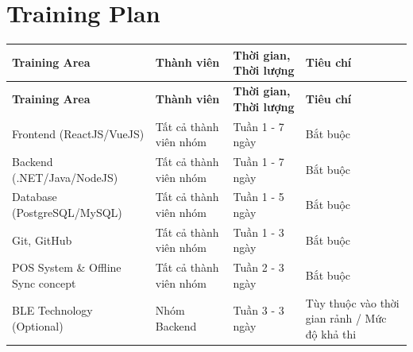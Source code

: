 \documentclass[a4paper,12pt]{article}
\begin{document}
	\section{Training Plan}
	
	\begin{longtable}{p{4cm} p{4cm} p{4cm} p{4cm}}
		\toprule
		\textbf{Training Area} & \textbf{Thành viên} & \textbf{Thời gian, Thời lượng} & \textbf{Tiêu chí} \\
		\midrule
		\endfirsthead
		\toprule
		\textbf{Training Area} & \textbf{Thành viên} & \textbf{Thời gian, Thời lượng} & \textbf{Tiêu chí} \\
		\midrule
		\endhead
		\bottomrule
		\endfoot
		Frontend (ReactJS/VueJS) & Tất cả thành viên nhóm & Tuần 1 - 7 ngày & Bắt buộc \\
		Backend (.NET/Java/NodeJS) & Tất cả thành viên nhóm & Tuần 1 - 7 ngày & Bắt buộc \\
		Database (PostgreSQL/MySQL) & Tất cả thành viên nhóm & Tuần 1 - 5 ngày & Bắt buộc \\
		Git, GitHub & Tất cả thành viên nhóm & Tuần 1 - 3 ngày & Bắt buộc \\
		POS System \& Offline Sync concept & Tất cả thành viên nhóm & Tuần 2 - 3 ngày & Bắt buộc \\
		BLE Technology (Optional) & Nhóm Backend & Tuần 3 - 3 ngày & Tùy thuộc vào thời gian rảnh / Mức độ khả thi \\
		\hline
	\end{longtable}
	
\end{document}
